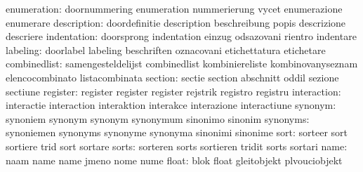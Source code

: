               enumeration: doornummering             enumeration
                           nummerierung              vycet
                           enumerazione              enumerare
              description: doordefinitie             description
                           beschreibung              popis
                           descrizione               descriere
              indentation: doorsprong                indentation
                           einzug                    odsazovani
                           rientro                   indentare
                 labeling: doorlabel                 labeling
                           beschriften               oznacovani
                           etichettatura             etichetare
             combinedlist: samengesteldelijst        combinedlist
                           kombiniereliste           kombinovanyseznam
                           elencocombinato           listacombinata
                  section: sectie                    section
                           abschnitt                 oddil
                           sezione                   sectiune
                 register: register                  register
                           register                  rejstrik
                           registro                  registru
              interaction: interactie                interaction
                           interaktion               interakce
                           interazione               interactiune
                  synonym: synoniem                  synonym
                           synonym                   synonymum
                           sinonimo                  sinonim
                 synonyms: synoniemen                synonyms
                           synonyme                  synonyma
                           sinonimi                  sinonime
                     sort: sorteer                   sort
                           sortiere                  trid
                           sort                      sortare %
                    sorts: sorteren                  sorts
                           sortieren                 tridit
                           sorts                     sortari %
                     name: naam                      name
                           name                      jmeno
                           nome                      nume
                    float: blok                      float
                           gleitobjekt               plvouciobjekt
